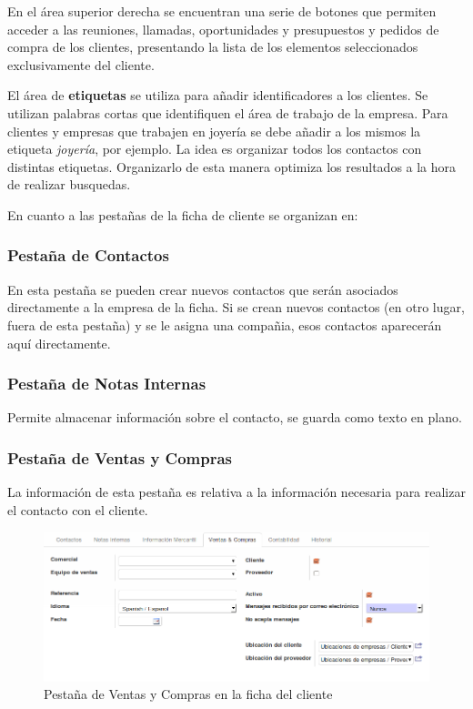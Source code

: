 En el área superior derecha se encuentran una serie de botones que permiten acceder a las reuniones, llamadas,
oportunidades y presupuestos y pedidos de compra de los clientes, presentando la lista de los elementos seleccionados
exclusivamente del cliente.

El área de \textbf{etiquetas} se utiliza para añadir identificadores a los clientes. Se utilizan
palabras cortas que identifiquen el área de trabajo de la empresa. Para clientes y empresas
que trabajen en joyería se debe añadir a los mismos la etiqueta \emph{joyería}, por ejemplo. La idea
es organizar todos los contactos con distintas etiquetas. Organizarlo de esta manera
optimiza los resultados a la hora de realizar busquedas.

En cuanto a las pestañas de la ficha de cliente se organizan en:

\subsubsection{Pestaña de Contactos}
En esta pestaña se pueden crear nuevos contactos que serán asociados directamente a la
empresa de la ficha. Si se crean nuevos contactos (en otro lugar, fuera de esta pestaña)
y se le asigna una compañia, esos contactos aparecerán aquí directamente.


\subsubsection{Pestaña de Notas Internas}
Permite almacenar información sobre el contacto, se guarda como texto en plano.


\subsubsection{Pestaña de Ventas y Compras}
La información de esta pestaña es relativa a la información necesaria para realizar el contacto
con el cliente.

\begin{figure}[H]
\includegraphics[width=\textwidth]{ventas/img/ven_cliventas.png}
\caption{Pestaña de Ventas y Compras en la ficha del cliente}
\label{ven:cliventas}
\end{figure}

